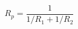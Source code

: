 \documentclass[12pt]{article}
\begin{document}
\sicpsize
\[
R_p = \frac{1}{1/R_1 + 1/R_2}
\]
\end{document}
